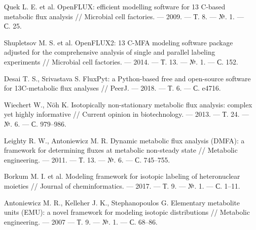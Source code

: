 \documentclass[14pt, a4paper]{extreport}
\begin{document}
\begin{thebibliography}{XXXX}
	Quek L. E. et al. OpenFLUX: efficient modelling software for 13 C-based metabolic flux analysis // Microbial cell factories. --- 2009. --- Т. 8. --- №. 1. --- С. 25.
	
	Shupletsov M. S. et al. OpenFLUX2: 13 C-MFA modeling software package adjusted for the comprehensive analysis of single and parallel labeling experiments // Microbial cell factories. --- 2014. --- Т. 13. --- №. 1. --- С. 152.
	
	Desai T. S., Srivastava S. FluxPyt: a Python-based free and open-source software for 13C-metabolic flux analyses // PeerJ. --- 2018. --- Т. 6. --- С. e4716.
	
	Wiechert W., Nöh K. Isotopically non-stationary metabolic flux analysis: complex yet highly informative // Current opinion in biotechnology. --- 2013. --- Т. 24. --- №. 6. --- С. 979--986.
	
	Leighty R. W., Antoniewicz M. R. Dynamic metabolic flux analysis (DMFA): a framework for determining fluxes at metabolic non-steady state // Metabolic engineering. --- 2011. --- Т. 13. --- №. 6. --- С. 745--755.

	
	Borkum M. I. et al. Modeling framework for isotopic labeling of heteronuclear moieties // Journal of cheminformatics. --- 2017. --- Т. 9. --- №. 1. --- С. 1--11.
	
	Antoniewicz M. R., Kelleher J. K., Stephanopoulos G. Elementary metabolite units (EMU): a novel framework for modeling isotopic distributions // Metabolic engineering. --- 2007 --- Т. 9. --- №. 1. --- С. 68--86.
	
\end{thebibliography}
\end{document}
